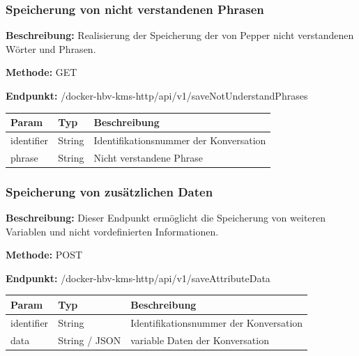 \dotfill

\subsubsection{Speicherung von nicht verstandenen Phrasen}
\label{sec:api-saveNotUnderstandPhrases}
\textbf{Beschreibung:} Realisierung der Speicherung der von Pepper nicht verstandenen Wörter und Phrasen.

\textbf{Methode:} GET

\textbf{Endpunkt:} /docker-hbv-kms-http/api/v1/saveNotUnderstandPhrases

\begin{table}[H]
    \label{table:/docker-hbv-kms-http/api/v1/saveNotUnderstandPhrases}
    \setlength{\tabcolsep}{3pt}
    \begin{tabular}{p{100pt}p{80pt}p{200pt}}
        \toprule
        Param      & Typ    & Beschreibung                           \\
        \midrule
        identifier & String & Identifikationsnummer der Konversation \\
        phrase     & String & Nicht verstandene Phrase               \\
        \bottomrule
    \end{tabular}
\end{table}

\dotfill

\subsubsection{Speicherung von zusätzlichen Daten}
\label{sec:api-saveAttributeData}
\textbf{Beschreibung:} Dieser Endpunkt ermöglicht die Speicherung von weiteren Variablen und nicht vordefinierten Informationen.

\textbf{Methode:} POST

\textbf{Endpunkt:} /docker-hbv-kms-http/api/v1/saveAttributeData

\begin{table}[H]
    \label{table:/docker-hbv-kms-http/api/v1/saveAttributeData}
    \setlength{\tabcolsep}{3pt}
    \begin{tabular}{p{100pt}p{80pt}p{200pt}}
        \toprule
        Param      & Typ           & Beschreibung                           \\
        \midrule
        identifier & String        & Identifikationsnummer der Konversation \\
        data       & String / JSON & variable Daten der Konversation        \\
        \bottomrule
    \end{tabular}
\end{table}
\dotfill



